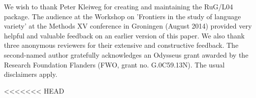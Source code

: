 \documentclass[output=paper]{LSP/langsci}
\begin{document}
We wish to thank Peter Kleiweg for creating and maintaining the RuG/L04 package. The audience at the Workshop on 'Frontiers in the study of language variety' at the Methods XV conference in Groningen (August 2014) provided very helpful and valuable feedback on an earlier version of this paper. We also thank three anonymous reviewers for their extensive and constructive feedback. The second-named author gratefully acknowledges an Odysseus grant awarded by the Research Foundation Flanders (FWO, grant no. G.0C59.13N). The usual disclaimers apply.


%

\printbibliography[heading=subbibliography,notkeyword=this]
<<<<<<< HEAD
\end{document}
